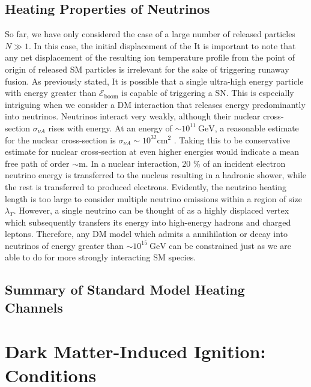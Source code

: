 \documentclass[twocolumn,showpacs,preprintnumbers,amsmath,amssymb,prd]{revtex4}
\newcommand{\Eboom}{\mathcal{E}_\text{boom}}
\newcommand{\GeV}{\text{GeV}}
\begin{document}
\subsection{Heating Properties of Neutrinos}

So far, we have only considered the case of a large number of released particles $N \gg 1$. In this case, the initial displacement of the 
It is important to note that any net displacement of the resulting ion temperature profile from the point of origin of released SM particles is irrelevant for the sake of triggering runaway fusion. 
As previously stated, It is possible that a single ultra-high energy particle with energy greater than $\Eboom$ is capable of triggering a SN. 
This is especially intriguing when we consider a DM interaction that releases energy predominantly into neutrinos.
Neutrinos interact very weakly, although their nuclear cross-section $\sigma_{\nu A}$ rises with energy.
At an energy of $\sim 10^{11} ~\GeV$, a reasonable estimate for the nuclear cross-section is $\sigma_{\nu A} \sim 10^{32} \text{cm}^2$ \cite{Formaggio:2013kya}. 
Taking this to be conservative estimate for nuclear cross-section at even higher energies would indicate a mean free path of order $\sim \text{m}$.
In a nuclear interaction, 20 \% of an incident electron neutrino energy is transferred to the nucleus resulting in a hadronic shower, while the rest is transferred to produced electrons. 
Evidently, the neutrino heating length is too large to consider multiple neutrino emissions within a region of size $\lambda_T$.
However, a single neutrino can be thought of as a highly displaced vertex which subsequently transfers its energy into high-energy hadrons and charged leptons.
Therefore, any DM model which admits a annihilation or decay into neutrinos of energy greater than $\sim 10^{15} ~\text{GeV}$ can be constrained just as we are able to do for more strongly interacting SM species.



\subsection{Summary of Standard Model Heating Channels}

\section{Dark Matter-Induced Ignition: Conditions}
\label{sec:DMexplode}
\end{document}
